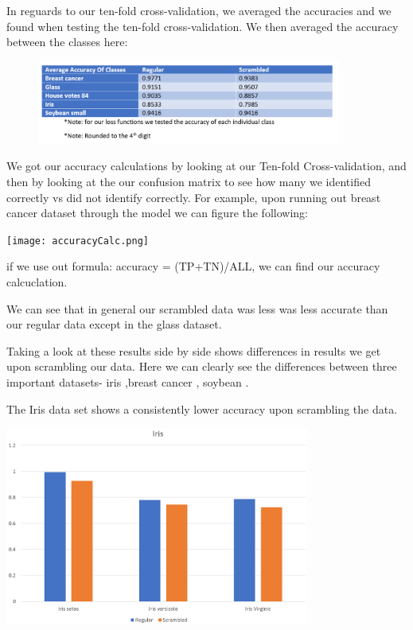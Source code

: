 \documentclass[twoside,11pt]{article}
\begin{document}
In reguards to our ten-fold cross-validation, we averaged the accuracies and we found when testing the ten-fold cross-validation. We then averaged the accuracy between the classes here:


\begin{figure}[htp]
    \centering
    \includegraphics[width=10cm]{table1Accuracy.png}
\end{figure}


We got our accuracy calculations by looking at our Ten-fold Cross-validation, and then by looking at the our confusion matrix to see how many we identified correctly vs did not identify correctly. For example, upon running out breast cancer dataset through the model we can figure the following:
\begin{center}
\texttt{[image: accuracyCalc.png]}
\end{center}

if we use out formula: accuracy = (TP+TN)/ALL, we can find our accuracy calcuclation.

We can see that in general our scrambled data was less was less accurate than our regular data except in the glass dataset.

Taking a look at these results side by side shows differences in results we get upon scrambling our data. Here we can clearly see the differences between three important datasets- iris \citep{},breast cancer \citep{wol87}, soybean \citep{}.

The Iris data set shows a consistently lower accuracy upon scrambling the data.
\begin{center}
\includegraphics[width=10cm]{iris.png}
\end{center}
\end{document}

